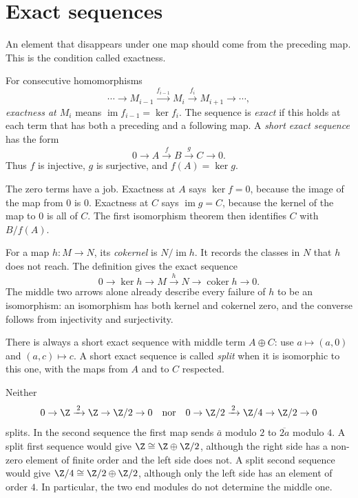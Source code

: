 \section{Exact sequences}

An element that disappears under one map should come from the preceding map. This is the condition called exactness.

\begin{definition}\label{def:exact}
For consecutive homomorphisms
\[
\cdots\longrightarrow M_{i-1}\xrightarrow{f_{i-1}}M_i
\xrightarrow{f_i}M_{i+1}\longrightarrow\cdots,
\]
\emph{exactness at $M_i$} means $\operatorname{im}f_{i-1}=\ker f_i$. The sequence is \emph{exact} if this holds at each term that has both a preceding and a following map. A \emph{short exact sequence} has the form
\[
0\longrightarrow A\xrightarrow f B\xrightarrow g C\longrightarrow0.
\]
Thus $f$ is injective, $g$ is surjective, and $f(A)=\ker g$.
\end{definition}

The zero terms have a job. Exactness at $A$ says $\ker f=0$, because the image of the map from $0$ is $0$. Exactness at $C$ says $\operatorname{im}g=C$, because the kernel of the map to $0$ is all of $C$. The first isomorphism theorem then identifies $C$ with $B/f(A)$.

For a map $h\colon M\to N$, its \emph{cokernel} is $N/\operatorname{im}h$. It records the classes in $N$ that $h$ does not reach. The definition gives the exact sequence
\[
0\to\ker h\to M\xrightarrow h N\to\operatorname{coker}h\to0.
\]
The middle two arrows alone already describe every failure of $h$ to be an isomorphism: an isomorphism has both kernel and cokernel zero, and the converse follows from injectivity and surjectivity.

There is always a short exact sequence with middle term $A\oplus C$: use $a\mapsto(a,0)$ and $(a,c)\mapsto c$. A short exact sequence is called \emph{split} when it is isomorphic to this one, with the maps from $A$ and to $C$ respected.

\begin{example}\label{ex:ses}
Neither
\[
0\to\Z\xrightarrow{\,2\,}\Z\to\Z/2\to0
\quad\text{nor}\quad
0\to\Z/2\xrightarrow{\,2\,}\Z/4\to\Z/2\to0
\]
splits. In the second sequence the first map sends $\bar a$ modulo $2$ to $\overline{2a}$ modulo $4$. A split first sequence would give $\Z\cong\Z\oplus\Z/2$, although the right side has a non-zero element of finite order and the left side does not. A split second sequence would give $\Z/4\cong\Z/2\oplus\Z/2$, although only the left side has an element of order $4$. In particular, the two end modules do not determine the middle one.
\end{example}

